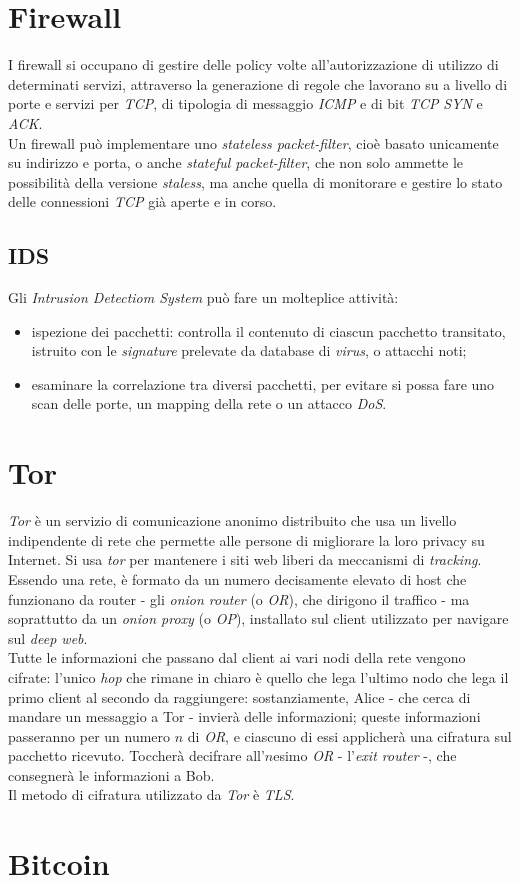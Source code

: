 \section{Firewall}
I firewall si occupano di gestire delle policy volte all'autorizzazione di utilizzo di determinati servizi, attraverso la generazione di regole che lavorano su a livello di porte e servizi per \textit{TCP}, di tipologia di messaggio \textit{ICMP} e di bit \textit{TCP} \textit{SYN} e \textit{ACK}. \\
Un firewall può implementare uno \textit{stateless packet-filter}, cioè basato unicamente su indirizzo e porta, o anche \textit{stateful packet-filter}, che non solo ammette le possibilità della versione \textit{staless}, ma anche quella di monitorare e gestire lo stato delle connessioni \textit{TCP} già aperte e in corso.

\subsection{IDS}
Gli \textit{Intrusion Detectiom System} può fare un molteplice attività:
\begin{itemize}
	\item ispezione dei pacchetti: controlla il contenuto di ciascun pacchetto transitato, istruito con le \textit{signature} prelevate da database di \textit{virus}, o attacchi noti;
	\item esaminare la correlazione tra diversi pacchetti, per evitare si possa fare uno scan delle porte, un mapping della rete o un attacco \textit{DoS}.
\end{itemize}

\section{Tor}
\textit{Tor} è un servizio di comunicazione anonimo distribuito che usa un livello indipendente di rete che permette alle persone di migliorare la loro privacy su Internet. Si usa \textit{tor} per mantenere i siti web liberi da meccanismi di \textit{tracking}. \\
Essendo una rete, è formato da un numero decisamente elevato di host che funzionano da router - gli \textit{onion router} (o \textit{OR}), che dirigono il traffico - ma soprattutto da un \textit{onion proxy} (o \textit{OP}), installato sul client utilizzato per navigare sul \textit{deep web}. \\
Tutte le informazioni che passano dal client ai vari nodi della rete vengono cifrate: l'unico \textit{hop} che rimane in chiaro è quello che lega l'ultimo nodo che lega il primo client al secondo da raggiungere: sostanziamente, Alice - che cerca di mandare un messaggio a Tor - invierà delle informazioni; queste informazioni passeranno per un numero $n$ di \textit{OR}, e ciascuno di essi applicherà una cifratura sul pacchetto ricevuto. Toccherà decifrare all'$n$esimo \textit{OR} - l'\textit{exit router} -, che consegnerà le informazioni a Bob. \\
Il metodo di cifratura utilizzato da \textit{Tor} è \textit{TLS}.

\section{Bitcoin}
